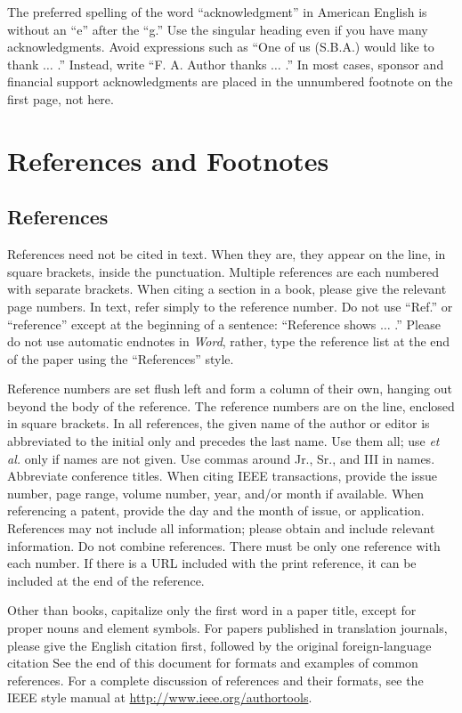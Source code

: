 \documentclass{IEEEtran}
\begin{document}
The preferred spelling of the word ``acknowledgment'' in American English is 
without an ``e'' after the ``g.'' Use the singular heading even if you have 
many acknowledgments. Avoid expressions such as ``One of us (S.B.A.) would 
like to thank $\ldots$ .'' Instead, write ``F. A. Author thanks $\ldots$ .'' In most 
cases, sponsor and financial support acknowledgments are placed in the 
unnumbered footnote on the first page, not here.

\section*{References and Footnotes}

\subsection{References}
References need not be cited in text. When they are, they appear on the 
line, in square brackets, inside the punctuation. Multiple references are 
each numbered with separate brackets. When citing a section in a book, 
please give the relevant page numbers. In text, refer simply to the 
reference number. Do not use ``Ref.'' or ``reference'' except at the 
beginning of a sentence: ``Reference \cite{b3} shows $\ldots$ .'' Please do not use 
automatic endnotes in \emph{Word}, rather, type the reference list at the end of the 
paper using the ``References'' style.

Reference numbers are set flush left and form a column of their own, hanging 
out beyond the body of the reference. The reference numbers are on the line, 
enclosed in square brackets. In all references, the given name of the author 
or editor is abbreviated to the initial only and precedes the last name. Use 
them all; use \emph{et al.} only if names are not given. Use commas around Jr., 
Sr., and III in names. Abbreviate conference titles. When citing IEEE 
transactions, provide the issue number, page range, volume number, year, 
and/or month if available. When referencing a patent, provide the day and 
the month of issue, or application. References may not include all 
information; please obtain and include relevant information. Do not combine 
references. There must be only one reference with each number. If there is a 
URL included with the print reference, it can be included at the end of the 
reference. 

Other than books, capitalize only the first word in a paper title, except 
for proper nouns and element symbols. For papers published in translation 
journals, please give the English citation first, followed by the original 
foreign-language citation See the end of this document for formats and 
examples of common references. For a complete discussion of references and 
their formats, see the IEEE style manual at
\underline{http://www.ieee.org/authortools}.
\end{document}
